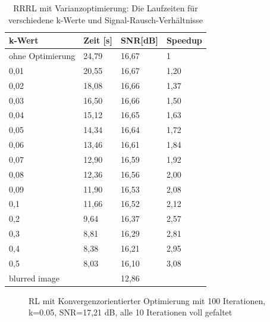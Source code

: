 \documentclass[a4paper,12pt]{article}
\begin{document}
\begin{table}[htbp]
\begin{center}
\begin{tabular}{ | l | l | l | l |}
\hline
k-Wert 			& Zeit [s] & SNR[dB] & Speedup \\ \hline
ohne Optimierung & 	24,79 & 16,67   & 	1	\\ \hline
0,01			&	20,55 & 16,67   &  1,20\\
0,02			&	18,08 & 16,66   & 	1,37\\
0,03			&	16,50 & 16,66   & 	1,50\\
0,04			&	15,12 & 16,65   & 	1,63\\
0,05			&	14,34 & 16,64   & 	1,72\\
0,06			&	13,46 & 16,61   & 	1,84\\ 
0,07			&	12,90 & 16,59   & 	1,92\\
0,08			&	12,36 & 16,56   & 	2,00\\
0,09			&	11,90 & 16,53   & 	2,08\\
0,1				&	11,66 & 16,52   & 	2,12\\
0,2				&	9,64  & 16,37   & 	2,57\\
0,3				&	8,81  & 16,29   & 	2,81\\
0,4				&   8,38  & 16,21   & 	2,95\\
0,5				&	8,03  & 16,10   & 	3,08\\ \hline
blurred image	&		  & 12,86 & \\
\hline
\end{tabular}
\caption{RRRL mit Varianzoptimierung: Die Laufzeiten für verschiedene k-Werte
und Signal-Rausch-Verhältnisse}
\label{tab:konv_time_SNR_RRRL}
\end{center}
\end{table}




\begin{figure}[htbp]
\caption{RL mit Konvergenzorientierter Optimierung mit 100 Iterationen, k=0.05,
SNR=17,21 dB, alle 10 Iterationen voll gefaltet}%
\label{figure_konv_k100}
\end{figure}
\end{document}
